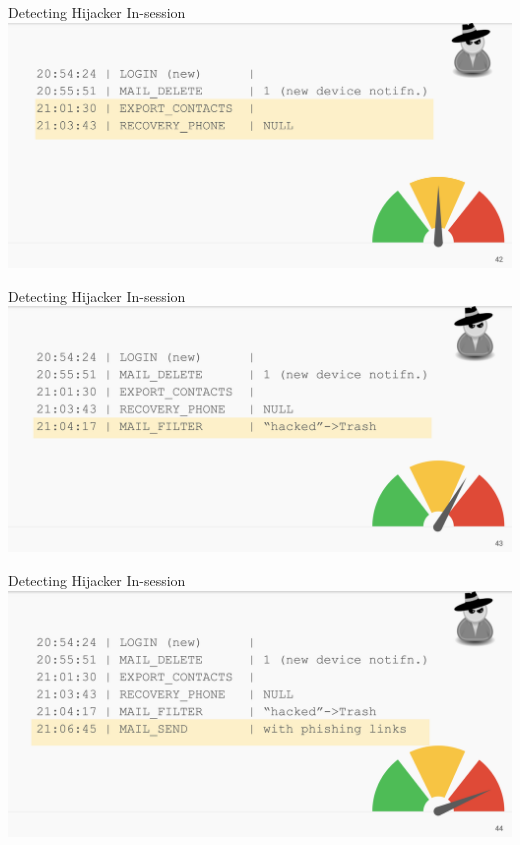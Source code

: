 \documentclass[nobackground,dvipsnames,table,aspectratio=169]{beamer}
\begin{document}
\begin{frame}{Detecting Hijacker In-session}
    \includegraphics[width=\textwidth]{detecting-hijackers-2}
\end{frame}

\begin{frame}{Detecting Hijacker In-session}
    \includegraphics[width=\textwidth]{detecting-hijackers-3}
\end{frame}

\begin{frame}{Detecting Hijacker In-session}
    \includegraphics[width=\textwidth]{detecting-hijackers-4}
\end{frame}
\end{document}
